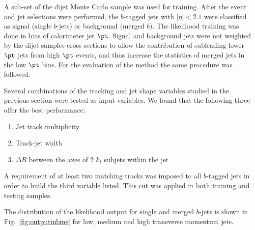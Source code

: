 A sub-set of the dijet Monte Carlo sample was used for training. After the event and jet selections were performed, the $b$-tagged jets with $|\eta| < 2.1$ were classified as signal (single $b$-jets) or background (merged $b$). %
The likelihood training was done in bins of calorimeter jet $\pt$. %
Signal and background jets were not weighted by the dijet samples cross-sections to allow the contribution of subleading lower $\pt$ jets from high $\pt$ events, and thus increase the statistics of merged jets in the low $\pt$ bins. For the evaluation of the method the same procedure was followed.

Several combinations of the tracking and jet shape variables studied in the previous section were tested as input variables. We found that the following three offer the best performance:
\begin{enumerate}\addtolength{\itemsep}{-0.4\baselineskip}
\item
Jet track multiplicity
\item
Track-jet width
\item
$\Delta R$ between the axes of 2 $k_t$ subjets within the jet
\end{enumerate}
%
A requirement of at least two matching tracks was imposed to all $b$-tagged jets in order to build the third variable listed. This cut was applied in both training and testing samples.

The distribution of the likelihood output for single and merged $b$-jets is shown in  Fig.~\ref{fig:outputinbins} for low, medium and high transverse momentum jets.

